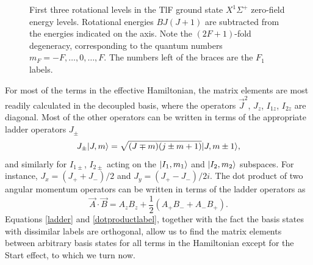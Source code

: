 \begin{figure}
    \centering
    
    \caption[Rotational spectrum of TlF.]{First three rotational levels in the
    TlF ground state $X^1\Sigma^+$ zero-field energy levels. Rotational energies
    $BJ(J+1)$ are subtracted from the energies indicated on the axis. Note the
    $(2F+1)$-fold degeneracy, corresponding to the quantum numbers
    $m_F=-F,\dots,0,\dots,F$. The numbers left of the braces are the $F_1$
    labels.}
    \label{diagram}
\end{figure}

For most of the terms in the effective Hamiltonian, the matrix elements are most
readily calculated in the decoupled basis, where the operators $\vec J^2$,
$J_z$, $I_{1z}$, $I_{2z}$ are diagonal. Most of the other operators can be
written in terms of the appropriate ladder operators $J_\pm$
\cite[eqns~3.5.39--40]{sakurai2011modern}
%
\begin{equation}
    \label{ladder}
    J_\pm|J,m\rangle=\sqrt{(J\mp m)(j\pm m+1)}|J,m\pm1\rangle,
\end{equation}
%
and similarly for $I_{1\pm}$, $I_{2\pm}$ acting on the $|I_1,m_1\rangle$ and
$|I_2,m_2\rangle$ subspaces. For instance, $J_x=(J_++J_-)/2$ and
$J_y=(J_+-J_-)/2i$. The dot product of two angular momentum operators can be
written in terms of the ladder operators as
%
\begin{equation}
    \label{dotproductlabel}
    \vec A\cdot\vec B=A_zB_z+\frac{1}{2}\left(
    A_+B_-+A_-B_+
    \right).
\end{equation}
%
Equations \ref{ladder} and \ref{dotproductlabel}, together with the fact the
basis states with dissimilar labels are orthogonal, allow us to find the matrix
elements between arbitrary basis states for all terms in the Hamiltonian except
for the Start effect, to which we turn now.

